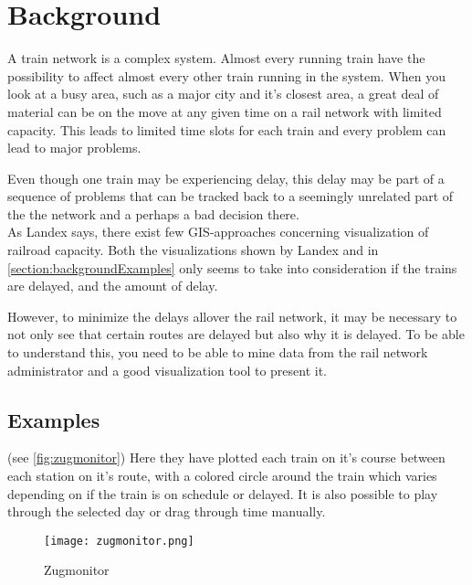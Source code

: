
\chapter{Background}
\label{chapter:background}

A train network is a complex system. Almost every running train have the 
possibility to affect almost every other train running in the system.  When you look at a busy area, such as a major city and it's closest
area, a great deal of material can be on the move at any given time on a
rail network with limited capacity. This leads to limited time slots for each 
train and every problem can lead to major problems.

Even though one train may be experiencing delay, this delay may be part of a
sequence of problems that can be tracked back to a seemingly unrelated part of
the the network and a perhaps a bad decision there\cite{cule2011mining}. \\

As Landex\cite{landex2009gis} says, there exist few GIS-approaches concerning
visualization of railroad capacity. Both the visualizations shown by Landex and
in \vref{section:backgroundExamples} only seems to take into consideration if
the trains are delayed, and the amount of delay. 

However, to minimize the delays allover the rail network, it may be necessary
to not only see that certain routes are delayed but also why it is delayed. To
be able to understand this, you need to be able to mine data from the rail
network administrator and a good visualization tool to present it. 

\section{Examples}
\label{section:backgroundExamples}

(see \vref{fig:zugmonitor})
Here they have plotted each train on it's course between each station on it's
route, with a colored circle around the train which varies depending on if the
train is on schedule or delayed. It is also possible to play through the
selected day or drag through time manually.

\begin{figure}[!htbp]
	\texttt{[image: zugmonitor.png]}
	\caption[Zugmonitor]{Zugmonitor \cite{zugmonitor}}
	\label{fig:zugmonitor}
\end{figure}
\pagebreak

